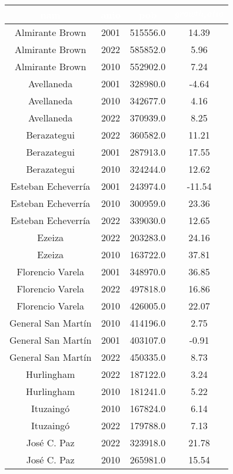 \begin{table}[htb]
\centering
\begin{tabular}{|c|c|c|c|}
\hline
\textbf{\cellcolor[rgb]{0,0.231,0.427}\textcolor{white}{nam}} & \textbf{\cellcolor[rgb]{0,0.231,0.427}\textcolor{white}{anio}} & \textbf{\cellcolor[rgb]{0,0.231,0.427}\textcolor{white}{pob}} & \textbf{\cellcolor[rgb]{0,0.231,0.427}\textcolor{white}{$growth_ratio$}} \\ \hline
Almirante Brown & 2001 & 515556.0 & 14.39 \\
Almirante Brown & 2022 & 585852.0 & 5.96 \\
Almirante Brown & 2010 & 552902.0 & 7.24 \\
Avellaneda & 2001 & 328980.0 & -4.64 \\
Avellaneda & 2010 & 342677.0 & 4.16 \\
Avellaneda & 2022 & 370939.0 & 8.25 \\
Berazategui & 2022 & 360582.0 & 11.21 \\
Berazategui & 2001 & 287913.0 & 17.55 \\
Berazategui & 2010 & 324244.0 & 12.62 \\
Esteban Echeverría & 2001 & 243974.0 & -11.54 \\
Esteban Echeverría & 2010 & 300959.0 & 23.36 \\
Esteban Echeverría & 2022 & 339030.0 & 12.65 \\
Ezeiza & 2022 & 203283.0 & 24.16 \\
Ezeiza & 2010 & 163722.0 & 37.81 \\
Florencio Varela & 2001 & 348970.0 & 36.85 \\
Florencio Varela & 2022 & 497818.0 & 16.86 \\
Florencio Varela & 2010 & 426005.0 & 22.07 \\
General San Martín & 2010 & 414196.0 & 2.75 \\
General San Martín & 2001 & 403107.0 & -0.91 \\
General San Martín & 2022 & 450335.0 & 8.73 \\
Hurlingham & 2022 & 187122.0 & 3.24 \\
Hurlingham & 2010 & 181241.0 & 5.22 \\
Ituzaingó & 2010 & 167824.0 & 6.14 \\
Ituzaingó & 2022 & 179788.0 & 7.13 \\
José C. Paz & 2022 & 323918.0 & 21.78 \\
José C. Paz & 2010 & 265981.0 & 15.54 \\

\end{tabular}
\end{table}
